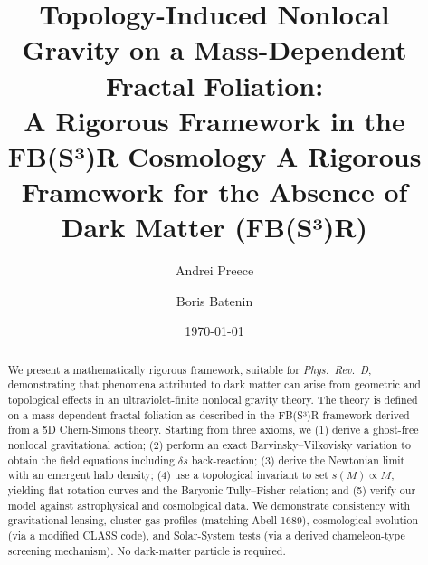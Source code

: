 \pgfplotsset{compat=1.18}

\newcommand{\BoxOp}{\Box} %
\newcommand{\DeltaNL}{\Delta^{\mathrm{NL}}} %
\newcommand{\rhoB}{\rho_B} %
\newcommand{\rhoD}{\rho_D} %
\newcommand{\Gmunu}{G_{\mu\nu}} %
\newcommand{\Tmunu}{T_{\mu\nu}} %
\DeclareMathOperator{\erf}{erf} %



\title{Topology-Induced Nonlocal Gravity on a Mass-Dependent Fractal Foliation:\\
A Rigorous Framework in the FB(S³)R Cosmology
A Rigorous Framework for the Absence of Dark Matter (FB(S³)R)}


\author{Andrei Preece}

\author{Boris Batenin}

\date{\today} %

\begin{abstract}
We present a mathematically rigorous framework, suitable for \emph{Phys.\ Rev.\ D}, demonstrating that phenomena attributed to dark matter can arise from geometric and topological effects in an ultraviolet-finite nonlocal gravity theory. The theory is defined on a mass-dependent fractal foliation as described in the FB(S³)R framework derived from a 5D Chern-Simons theory. Starting from three axioms, we (1) derive a ghost-free nonlocal gravitational action; (2) perform an exact Barvinsky--Vilkovisky variation to obtain the field equations including $\delta s$ back-reaction; (3) derive the Newtonian limit with an emergent halo density; (4) use a topological invariant to set $s(M)\propto M$, yielding flat rotation curves and the Baryonic Tully--Fisher relation; and (5) verify our model against astrophysical and cosmological data. We demonstrate consistency with gravitational lensing, cluster gas profiles (matching Abell 1689), cosmological evolution (via a modified CLASS code), and Solar-System tests (via a derived chameleon-type screening mechanism). No dark-matter particle is required.
\end{abstract}

